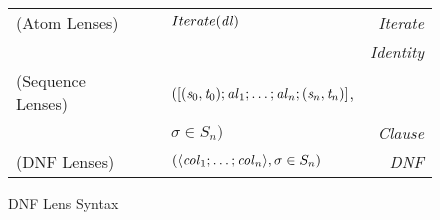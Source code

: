 \begin{figure}
\centering
\begin{tabular}{@{}l@{\ }l@{\ }c@{}l@{\ }>{\itshape\/}r@{}}
(Atom Lenses) &\AtomLens{} & \GEq{} & $Iterate(\mathit{dl})$ & Iterate\\
& & & \GBar{} \IdentityLens{} & Identity\\
(Sequence Lenses) &\SequenceLens{} & \GEq{} &
$([(\mathit{s}_0,\mathit{t}_0);\mathit{al}_1;\ldots;\mathit{al}_n;(\mathit{s}_n,\mathit{t}_n)]$, &\\
& & & $\sigma \in S_n)$ & Clause\SubN{}\\
(DNF Lenses)& \DNFLens{} & \GEq{} & $(\langle\mathit{col}_1;\ldots;\mathit{col}_n\rangle, \sigma \in S_n)$ & DNF\SubN{}\\
\end{tabular}
\caption{DNF Lens Syntax}
\label{fig:dnf-lens-syntax}
\end{figure}
